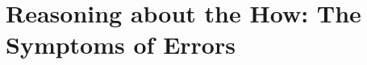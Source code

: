 \documentclass[11pt]{article}
\begin{document}
%



%
\section{Reasoning about the How: The Symptoms of Errors}
\label{sec:how}
\end{document}
